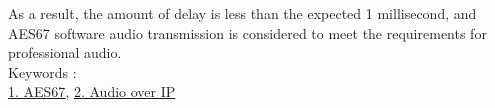 As a result, the amount of delay is less than the expected 1 millisecond, and AES67 software audio transmission is considered to meet the requirements for professional audio.
~ \\
Keywords : \\
\underline{1. AES67},
\underline{2. Audio over IP}
\begin{flushright}
\edept \\
\eauthor
\end{flushright}
